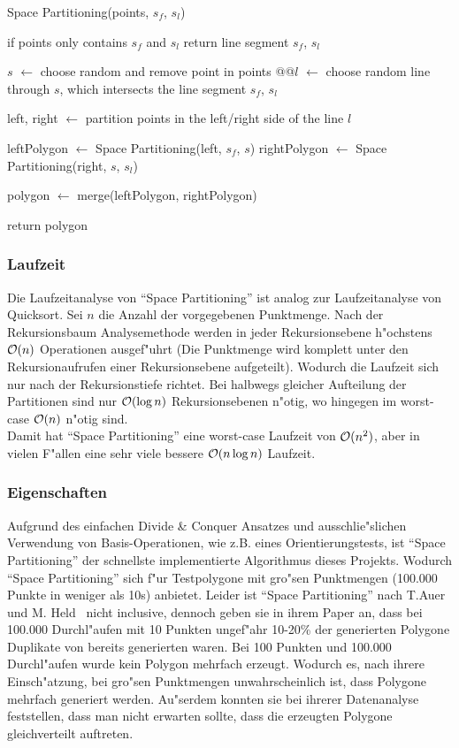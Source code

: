 \begin{code}[caption={Rekursion Space Partitioning}, mathescape=true, escapeinside={@}{@}]
Space Partitioning(points, $s_f$, $s_l$)

  if points only contains $s_f$ and $s_l$
    return line segment $s_f$, $s_l$

  $s$ $\leftarrow$ choose random and remove point in points
  @\label{lst:space_line}@$l$ $\leftarrow$ choose random line through $s$, which intersects the line segment $s_f$, $s_l$

  left, right $\leftarrow$ partition points in the left/right side of the line $l$

  leftPolygon $\leftarrow$ Space Partitioning(left, $s_f$, $s$)
  rightPolygon $\leftarrow$ Space Partitioning(right, $s$, $s_l$)

  polygon $\leftarrow$ merge(leftPolygon, rightPolygon)

  return polygon
\end{code}

\subsubsection{Laufzeit}

Die Laufzeitanalyse von ``Space Partitioning'' ist analog zur Laufzeitanalyse
von Quicksort. Sei $n$ die Anzahl der vorgegebenen Punktmenge.
Nach der Rekursionsbaum Analysemethode werden in jeder Rekursionsebene 
h"ochstens $\mathcal{O}(n)$ Operationen ausgef"uhrt (Die Punktmenge wird komplett
unter den Rekursionaufrufen einer Rekursionsebene aufgeteilt).
Wodurch die Laufzeit sich nur nach der Rekursionstiefe richtet.
Bei halbwegs gleicher Aufteilung der Partitionen sind nur $\mathcal{O}(\log n)$
Rekursionsebenen n"otig, wo hingegen im worst-case $\mathcal{O}(n)$ n"otig sind. \\
Damit hat ``Space Partitioning'' eine worst-case Laufzeit von
$\mathcal{O}(n^2)$, aber in vielen F"allen eine sehr viele bessere $\mathcal{O}(n \log n)$
Laufzeit.

\subsubsection{Eigenschaften}
Aufgrund des einfachen Divide \& Conquer Ansatzes und ausschlie"slichen Verwendung
von Basis-Operationen, wie z.B. eines Orientierungstests, ist ``Space Partitioning''
der schnellste implementierte Algorithmus dieses Projekts.
Wodurch ``Space Partitioning'' sich f"ur Testpolygone mit gro"sen Punktmengen
(100.000 Punkte in weniger als 10s) anbietet.
Leider ist ``Space Partitioning'' nach T.Auer und M. Held~\cite{held98polygons} nicht inclusive, 
dennoch geben sie in ihrem Paper an, dass
bei 100.000 Durchl"aufen mit 10 Punkten ungef"ahr 10-20\% der
generierten Polygone Duplikate von bereits generierten waren.
Bei 100 Punkten und 100.000 Durchl"aufen wurde kein Polygon mehrfach erzeugt.
Wodurch es, nach ihrere Einsch"atzung, bei gro"sen Punktmengen unwahrscheinlich ist,
dass Polygone mehrfach generiert werden. Au"serdem konnten sie bei ihrerer Datenanalyse
feststellen, dass man nicht erwarten sollte, dass die erzeugten Polygone gleichverteilt
auftreten.
